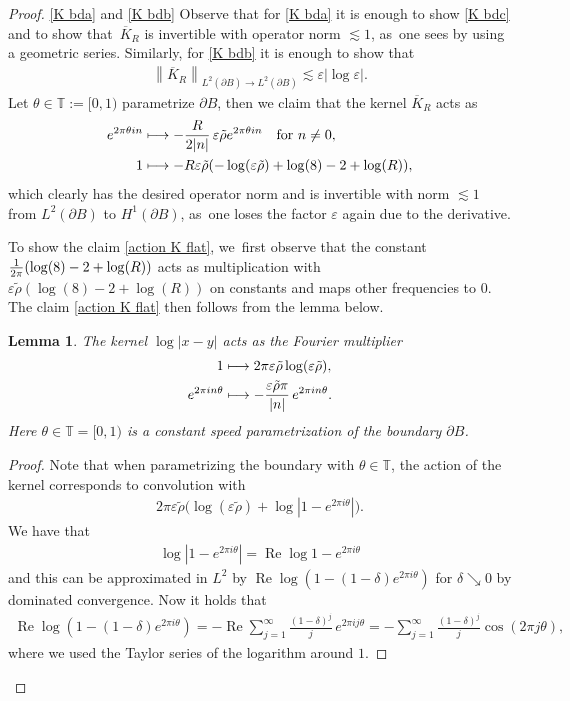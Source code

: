 \documentclass[10pt]{amsart}
\newcommand\mto{\mathchoice{\longmapsto}{\mapsto}{\mapsto}{\mapsto}}
\let\epsilon\varepsilon
\newtheorem{lemma}[theorem]{Lemma}
\theoremstyle{definition}
\renewcommand{\Re}{\operatorname{Re}}
\newcommand\T{\mathbb{T}}
\newcommand\norm[1]{\left\lVert #1\right\rVert}
\newcommand\eq{=}
\let\de\partial
\let\eps\epsilon
\begin{document}
\skpt
\begin{proof}
\eqref{K bda} and \eqref{K bdb} Observe that for \eqref{K bda} it is enough to show \eqref{K bdc} and to show that~$\overline{K}_R$ is invertible with operator norm $\lesssim 1$, as~one sees \eg by using a geometric series. Similarly, for \eqref{K bdb} it is enough to show that
\begin{align}
\norm{\overline{K}_R}_{L^2(\de B)\to L^2(\de B)}\lesssim \eps|{\log\eps}|.
\end{align}
Let $\theta\in\T:= [0,1)$ parametrize $\de B$, then we claim that the kernel $\overline{K}_R$ acts as
\begin{equation}\begin{aligned}\label{action K flat}
e^{2\pi\theta in}&\mto -\frac{R}{2|n|}\,\eps\tilde{\rho} e^{2\pi\theta in} \quad\text{for $n\neq 0$},\\
1&\mto -R\eps\tilde{\rho}(-\log(\eps\tilde{\rho})+\log(8)-2+\log(R)),
\end{aligned}\end{equation}
which clearly has the desired operator norm and is invertible with norm $\lesssim 1$ from $L^2(\de B)$ to $H^1(\de B)$, as~one loses the factor $\eps$ again due to the derivative.

To show the claim \eqref{action K flat}, we~first observe that the constant $\frac{1}{2\pi}(\log(8)-2+\nobreak\log(R))$ acts as multiplication with $\eps\tilde{\rho}(\log(8)-2+\log(R))$ on constants and maps other frequencies to $0$. The claim \eqref{action K flat} then follows from the lemma below.

\begin{lemma}\label{action log}
The kernel $\log|x-y|$ acts as the Fourier multiplier
\begin{align*}
1&\mto 2\pi\eps\tilde{\rho}\log(\eps\tilde{\rho}),\\
e^{2\pi in\theta}&\mto -\frac{\eps\tilde{\rho}\pi}{|n|}\,e^{2\pi in\theta}.
\end{align*}
Here $\theta\in \T=[0,1)$ is a constant speed parametrization of the boundary $\de B$.
\end{lemma}
\begin{proof}
Note that when parametrizing the boundary with $\theta\in\T$, the action of the kernel corresponds to convolution with
\begin{align*}
2\pi\eps\tilde{\rho}\bigl(\log(\eps\tilde{\rho})+\log|1-e^{2\pi i\theta}|\bigr).
\end{align*}
We have that
\begin{align*}
\log|1-e^{2\pi i\theta}|\eq \Re \log1-e^{2\pi i\theta}
\end{align*}
and this can be approximated in $L^2$ by $\Re\log(1-(1-\delta)e^{2\pi i\theta})$ for $\delta\searrow 0$ by \eg dominated convergence. Now it holds that
\begin{align*}
\Re\log(1-(1-\delta)e^{2\pi i\theta})\eq -\Re\sum_{j=1}^\infty\frac{(1-\delta)^j}{j}\,e^{2\pi ij\theta}\eq-\sum_{j=1}^\infty\frac{(1-\delta)^j}{j}\cos(2\pi j\theta),
\end{align*}
where we used the Taylor series of the logarithm around $1$.


\end{proof}
\end{proof}
\end{document}
